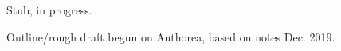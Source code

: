\begin{description}
\item [{Status}] Stub, in progress.
\item 
\item [{03/05/20}] Outline/rough draft begun on Authorea, based on notes Dec. 2019.
\end{description}